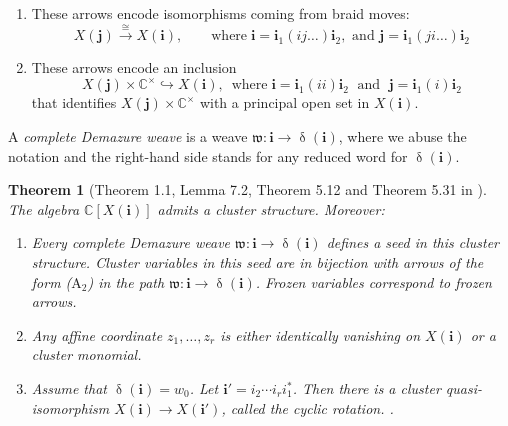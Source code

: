 \documentclass[a4paper, 11pt]{amsart}
\newcommand{\weave}{\mathfrak{w}}
\newcommand{\word}[1]{\mathbf{#1}}
\DeclareMathOperator{\dem}{\delta}
\newcommand{\C}{\mathbb{C}}
\newtheorem{theorem}{Theorem}[section]
\theoremstyle{definition}
\begin{document}
\begin{enumerate}
    \item[($\mathrm{A}_1$)]  These arrows encode isomorphisms coming from braid moves:
    \begin{equation}\label{eq:2m-valent}
    X(\word{j}) \xrightarrow{\cong} X(\word{i}), \qquad \text{where} \; \word{i} =  \word{i}_1\!(ij\dots)\word{i}_2, \text{ and } \word{j} = \word{i}_1(ji\dots)\word{i}_2 
    \end{equation}
    \item[($\mathrm{A}_2$)]  These arrows encode an inclusion
    \begin{equation}\label{eqa:3-valent}
    X(\word{j}) \times \C^{\times} \hookrightarrow X(\word{i}), \,\,\,\text{where} \; \word{i} = \word{i}_1 (i i) \word{i}_2 \; \text{ and } \; \word{j} = \word{i}_1 (i ) \word{i}_2
    \end{equation}
    that identifies $X(\word{j}) \times \C^{\times}$ with a principal open set in $X(\word{i})$.
\end{enumerate} 

A \emph{complete Demazure weave} is a weave $\weave: \word{i} \to \dem(\word{i})$, where we abuse the notation and the right-hand side stands for any reduced word for $\dem(\word{i})$. 



\begin{theorem}[Theorem 1.1, Lemma 7.2, Theorem 5.12 and Theorem 5.31 in \cite{CGGLSS}]\label{thm:cluster-structure}
The algebra $\C[X(\word{i})]$ admits a cluster structure. Moreover:
\begin{enumerate}
\item Every complete Demazure weave $\weave: \word{i} \to \dem(\word{i})$ defines a seed in this cluster structure. Cluster variables in this seed are in bijection with arrows of the form ($\mathrm{A}_2$) in the path $\weave: \word{i} \to \dem(\word{i})$. Frozen variables correspond to frozen arrows. \cite[Theorem 1.1, Lemma 7.2]{CGGLSS}
\item Any affine coordinate $z_1, \dots, z_r$ is either identically vanishing on $X(\word{i})$ or a cluster monomial. \cite[Lemma 5.24, Corollary 5.34]{CGGLSS}
\item Assume that $\dem(\word{i}) = w_0$. Let $\word{i}' = i_2\cdots i_{r}i_{1}^{\ast}$. Then there is a cluster quasi-isomorphism $X(\word{i}) \to X(\word{i}')$, called the \emph{cyclic rotation}. \cite[Theorem 5.31]{CGGLSS}.
\end{enumerate}
\end{theorem}
\end{document}
